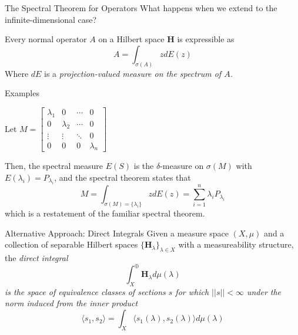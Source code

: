\documentclass{beamer}
\begin{document}
\begin{frame}{The Spectral Theorem for Operators}
    What happens when we extend to the infinite-dimensional case?

    \begin{theorem}
        Every normal operator $A$ on a Hilbert space \textbf{H} is expressible
        as
        \[
            A = \int_{\sigma(A)} zdE(z)
        \]
        Where $dE$ is a \em projection-valued measure \em on the spectrum of
        $A$.
    \end{theorem}
\end{frame}

\begin{frame}{Examples}
    \begin{example}
        Let $M = 
            \begin{bmatrix}
                \lambda_1 & 0 & \cdots & 0 \\
                0 & \lambda_2 & \cdots & 0 \\
                \vdots & \vdots & \ddots & 0\\
                0 & 0 & 0 & \lambda_n 
            \end{bmatrix}$

            Then, the spectral measure $E(S)$ is the $\delta$-measure on
            $\sigma(M)$ with $E(\lambda_i) = P_{\lambda_i}$, and the spectral
            theorem states that
            \[
                M = \int_{\sigma(M) = \{\lambda_i\}} zdE(z)
                  = \sum_{i=1}^n \lambda_i P_{\lambda_i}
                  \]
            which is a restatement of the familiar spectral theorem.
    \end{example}

\end{frame}

\begin{frame}{Alternative Approach: Direct Integrals}
    Given a measure space $(X,\mu)$ and a collection of separable Hilbert spaces
    $\{\textbf{H}_{\lambda}\}_{\lambda \in X}$ with a measureability structure,
    the \em direct integral \em 
            \[
                \int_{X}^{\oplus} \textbf{H}_{\lambda} d\mu(\lambda)
            \]
    is the space of equivalence classes of sections $s$ for which
    $||s|| < \infty$ under the norm induced from the inner product
    \[
        \langle s_1, s_2 \rangle = 
        \int_X\langle s_1(\lambda),s_2(\lambda) \rangle d\mu(\lambda)
    \]

\end{frame}
\end{document}
